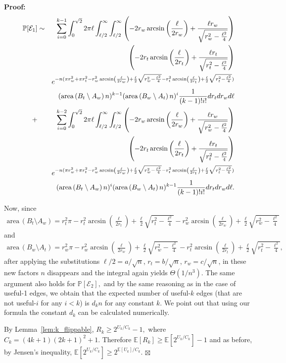 \documentclass {journal}
\newenvironment {proof}{\textbf {Proof:}}{\hfill \ensuremath {\boxtimes}}
\newcommand{\bE}{{\mathbb E}}
\newcommand{\bP}{{\mathbb P}}
\begin{document}
\begin{proof}
\begin{eqnarray*}\label{eq:case1_k}
 \bP[\mathcal{E}_1]&\sim&
\sum_{i=0}^{k-1} \int_0^{\sqrt{2}} 2\pi \ell
\int_{\ell/2}^{\infty}\int_{\ell/2}^{\infty}
\left(-2r_w \arcsin\left(\frac{\ell}{2r_w}\right)+\frac{\ell r_w}{\sqrt{r_w^2 - \frac{\ell^2}{4}}} \right) \notag\\
&& \left(-2r_t \arcsin\left(\frac{\ell}{2r_t}\right)+\frac{\ell r_t}{\sqrt{r_t^2 - \frac{\ell^2}{4}}} \right) \notag\\
&& e^{-n(\pi r_w^2+\pi r_t^2 - r_w^2
\arcsin\left(\frac{\ell}{2r_w}\right)
+\frac{\ell}{2}\sqrt{r_w^2-\frac{\ell^2}{4}}-r_t^2
\arcsin\left(\frac{\ell}{2r_t}\right)+\frac{\ell}{2}\sqrt{r_t^2-\frac{\ell^2}{4}}
)} \notag\\
&& (\textrm{area}\,(B_t \setminus A_w)\,n)^{k-1}
(\textrm{area}\,(B_w \setminus A_t)\,n)^{i} \frac{1}{(k-1)!i!}
dr_t dr_w d\ell \notag\\
+ && \sum_{i=0}^{k-2} \int_0^{\sqrt{2}} 2\pi \ell
\int_{\ell/2}^{\infty}\int_{\ell/2}^{\infty}
\left(-2r_w \arcsin\left(\frac{\ell}{2r_w}\right)+\frac{\ell r_w}{\sqrt{r_w^2 - \frac{\ell^2}{4}}} \right) \notag\\
&& \left(-2r_t \arcsin\left(\frac{\ell}{2r_t}\right)+\frac{\ell r_t}{\sqrt{r_t^2 - \frac{\ell^2}{4}}} \right) \notag\\
&& e^{-n(\pi r_w^2+\pi r_t^2 - r_w^2
\arcsin\left(\frac{\ell}{2r_w}\right)
+\frac{\ell}{2}\sqrt{r_w^2-\frac{\ell^2}{4}}-r_t^2
\arcsin\left(\frac{\ell}{2r_t}\right)+\frac{\ell}{2}\sqrt{r_t^2-\frac{\ell^2}{4}}
)} \notag\\
&& (\textrm{area}\,(B_t \setminus A_w)\,n)^{i}
(\textrm{area}\,(B_w \setminus A_t)\,n)^{k-1}  \frac{1}{(k-1)!i!}
dr_t dr_w d\ell.
\end{eqnarray*}

Now, since
\begin{eqnarray*}
\textrm{area}\,(B_t \setminus A_w)=r_t^2 \pi-r_t^2 \arcsin\left(\frac{\ell}{2r_t}\right)
+\frac{\ell}{2}\sqrt{r_t^2-\frac{\ell^2}{4}}-r_w^2
\arcsin\left(\frac{\ell}{2r_w}\right)+\frac{\ell}{2}\sqrt{r_w^2-\frac{\ell^2}{4}}
\end{eqnarray*}
and
\begin{eqnarray*}
\textrm{area}\,(B_w \setminus A_t)=r_w^2 \pi-r_w^2 \arcsin\left(\frac{\ell}{2r_w}\right)
+\frac{\ell}{2}\sqrt{r_w^2-\frac{\ell^2}{4}}-r_t^2
\arcsin\left(\frac{\ell}{2r_t}\right)+\frac{\ell}{2}\sqrt{r_t^2-\frac{\ell^2}{4}},
\end{eqnarray*}
after applying the substitutions $\ell/2= a/\sqrt n$, $r_t=b/\sqrt
n$, $r_w = c/\sqrt n$, in these new factors $n$ disappears and the
integral again yields $\Theta(1/n^3)$. The same argument also
holds for $\bP[\mathcal{E}_2],$ and by the same reasoning as in
the case of useful-1 edges, we obtain that the expected number of
useful-$k$ edges (that are not useful-$i$ for any $i < k$) is $d_k
n$ for any constant $k$. We point out that using our formula the
constant $d_k$ can be calculated numerically.

By Lemma~\ref{lem:k_flippable}, $R_k\geq 2^{U_k/C_k}-1,$ where
$C_k=(4k+1)(2k+1)^2+1.$ Therefore $\bE[R_k]\geq
\bE[2^{U_k/C_k}]-1$ and as before, by Jensen's inequality,
$\bE[2^{U_k/C_k}]\geq 2^{\bE[U_k]/C_k}.$
\end{proof}
\end{document}
